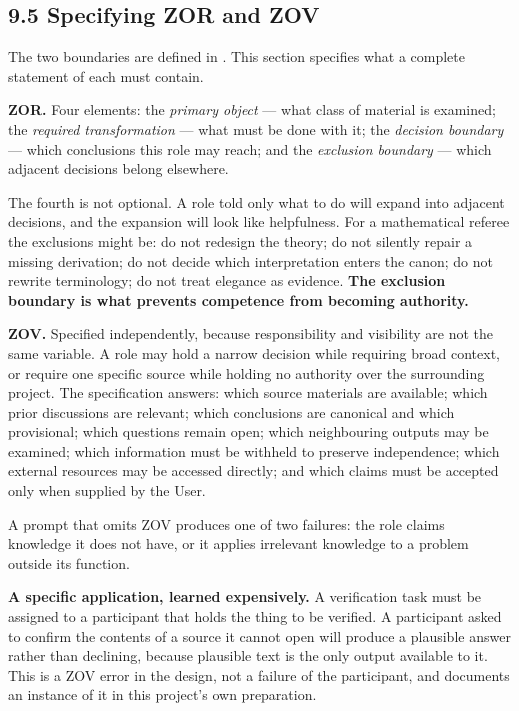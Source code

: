 \subsection*{9.5 Specifying ZOR and ZOV}
\label{sec:en:9.5}

The two boundaries are defined in . This section specifies what a complete statement of each must contain.

\textbf{ZOR.} Four elements: the \emph{primary object} — what class of material is examined; the \emph{required transformation} — what must be done with it; the \emph{decision boundary} — which conclusions this role may reach; and the \emph{exclusion boundary} — which adjacent decisions belong elsewhere.

The fourth is not optional. A role told only what to do will expand into adjacent decisions, and the expansion will look like helpfulness. For a mathematical referee the exclusions might be: do not redesign the theory; do not silently repair a missing derivation; do not decide which interpretation enters the canon; do not rewrite terminology; do not treat elegance as evidence. \textbf{The exclusion boundary is what prevents competence from becoming authority.}

\textbf{ZOV.} Specified independently, because responsibility and visibility are not the same variable. A role may hold a narrow decision while requiring broad context, or require one specific source while holding no authority over the surrounding project. The specification answers: which source materials are available; which prior discussions are relevant; which conclusions are canonical and which provisional; which questions remain open; which neighbouring outputs may be examined; which information must be withheld to preserve independence; which external resources may be accessed directly; and which claims must be accepted only when supplied by the User.

A prompt that omits ZOV produces one of two failures: the role claims knowledge it does not have, or it applies irrelevant knowledge to a problem outside its function.

\textbf{A specific application, learned expensively.} A verification task must be assigned to a participant that holds the thing to be verified. A participant asked to confirm the contents of a source it cannot open will produce a plausible answer rather than declining, because plausible text is the only output available to it. This is a ZOV error in the design, not a failure of the participant, and  documents an instance of it in this project's own preparation.


